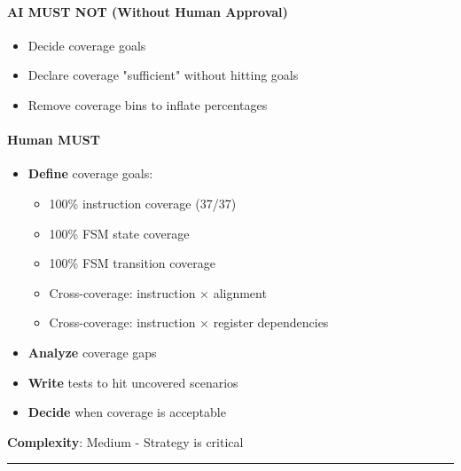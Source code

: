 \paragraph{\texorpdfstring{\warn{} AI MUST NOT (Without Human
Approval)}{ AI MUST NOT (Without Human Approval)}}\label{cr:status:phase1-ai-human-responsibilities:warning-ai-must-not-without-human-approval-17}

\begin{record}

\begin{itemize}
\tightlist
\item
  Decide coverage goals
\item
  Declare coverage "sufficient" without hitting goals
\item
  Remove coverage bins to inflate percentages
\end{itemize}

\end{record}

\paragraph{\texorpdfstring{\hold{} Human MUST}{ Human MUST}}\label{cr:status:phase1-ai-human-responsibilities:raised-hand-human-must-17}

\begin{record}

\begin{itemize}
\tightlist
\item
  \textbf{Define} coverage goals:

  \begin{itemize}
  \tightlist
  \item
    100\% instruction coverage (37/37)
  \item
    100\% FSM state coverage
  \item
    100\% FSM transition coverage
  \item
    Cross-coverage: instruction × alignment
  \item
    Cross-coverage: instruction × register dependencies
  \end{itemize}
\item
  \textbf{Analyze} coverage gaps
\item
  \textbf{Write} tests to hit uncovered scenarios
\item
  \textbf{Decide} when coverage is acceptable
\end{itemize}

\textbf{Complexity}: \partialmark{} Medium - Strategy is critical

\begin{center}\rule{0.5\linewidth}{0.5pt}\end{center}

\end{record}

